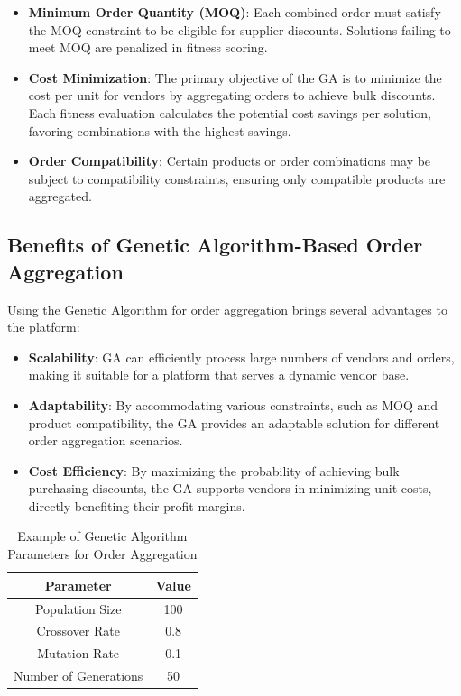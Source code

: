 \begin{itemize}
    \item \textbf{Minimum Order Quantity (MOQ)}: Each combined order must satisfy the MOQ constraint to be eligible for supplier discounts. Solutions failing to meet MOQ are penalized in fitness scoring.
    
    \item \textbf{Cost Minimization}: The primary objective of the GA is to minimize the cost per unit for vendors by aggregating orders to achieve bulk discounts. Each fitness evaluation calculates the potential cost savings per solution, favoring combinations with the highest savings.
    
    \item \textbf{Order Compatibility}: Certain products or order combinations may be subject to compatibility constraints, ensuring only compatible products are aggregated.
\end{itemize}

\subsection{Benefits of Genetic Algorithm-Based Order Aggregation}

Using the Genetic Algorithm for order aggregation brings several advantages to the platform:

\begin{itemize}
    \item \textbf{Scalability}: GA can efficiently process large numbers of vendors and orders, making it suitable for a platform that serves a dynamic vendor base.
    
    \item \textbf{Adaptability}: By accommodating various constraints, such as MOQ and product compatibility, the GA provides an adaptable solution for different order aggregation scenarios.
    
    \item \textbf{Cost Efficiency}: By maximizing the probability of achieving bulk purchasing discounts, the GA supports vendors in minimizing unit costs, directly benefiting their profit margins.
\end{itemize}

\begin{table}[H]
\centering
\caption{Example of Genetic Algorithm Parameters for Order Aggregation}
\begin{tabular}{|c|c|}
\hline
\textbf{Parameter} & \textbf{Value} \\ \hline
Population Size & 100 \\ \hline
Crossover Rate & 0.8 \\ \hline
Mutation Rate & 0.1 \\ \hline
Number of Generations & 50 \\ \hline
\end{tabular}
\end{table}

